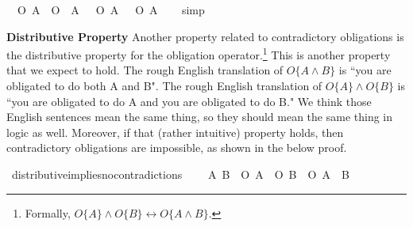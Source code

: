 \begin{isabellebody}
\begin{isamarkuptext}
\medskip%
\end{isamarkuptext}\isamarkuptrue%
\isamarkupfalse%
\ {\isachardoublequoteopen}{\isasymTurnstile}\ {\isacharparenleft}{\isacharparenleft}O\ {\isacharbraceleft}A{\isacharbraceright}\ \isactrlbold {\isasymand}\ O\ {\isacharbraceleft}\isactrlbold {\isasymnot}\ A{\isacharbraceright}{\isacharparenright}\ \isactrlbold {\isasymequiv}\ {\isacharparenleft}\isactrlbold {\isasymnot}\ {\isacharparenleft}O\ {\isacharbraceleft}A{\isacharbraceright}\ \isactrlbold {\isasymrightarrow}\ \isactrlbold {\isasymnot}\ O\ {\isacharbraceleft}\isactrlbold {\isasymnot}A{\isacharbraceright}{\isacharparenright}{\isacharparenright}{\isacharparenright}{\isachardoublequoteclose}\isanewline
%
\isadelimproof
\ \ %
\endisadelimproof
%
\isatagproof
{}\isamarkupfalse%
\ simp\isanewline
%
%
\endisatagproof
{\isafoldproof}%
%
\isadelimproof
%
\endisadelimproof
%
\begin{isamarkuptext}%
\noindent \textbf{Distributive Property} Another property related to contradictory obligations is the distributive property for the obligation
operator.\footnote{Formally, $O\{A\} \wedge O\{B\} \longleftrightarrow O\{A \wedge B\}$.} This is 
another property that we expect to hold. The rough English translation of  $O \{ A \wedge B \} $ is ``you are obligated to 
do both A and B". The rough English translation of $O\{A\} \wedge O\{B\}$ is ``you are obligated to do A 
and you are obligated to do B." We think those English sentences mean the same thing, so they should mean 
the same thing in logic as well. Moreover, if that (rather intuitive) property holds, then contradictory
obligations are impossible, as shown in the below proof.%
\end{isamarkuptext}\isamarkuptrue%
\isamarkupfalse%
\ distributive{\isacharunderscore}implies{\isacharunderscore}no{\isacharunderscore}contradictions{\isacharcolon}\ \isanewline
\ \ \ {\isachardoublequoteopen}{\isasymforall}A\ B{\isachardot}\ {\isasymTurnstile}\ {\isacharparenleft}{\isacharparenleft}O\ {\isacharbraceleft}A{\isacharbraceright}\ \isactrlbold {\isasymand}\ O\ {\isacharbraceleft}B{\isacharbraceright}{\isacharparenright}\ \isactrlbold {\isasymequiv}\ O\ {\isacharbraceleft}A\ \isactrlbold {\isasymand}\ B{\isacharbraceright}{\isacharparenright}{\isachardoublequoteclose}\isanewline

\end{isabellebody}
